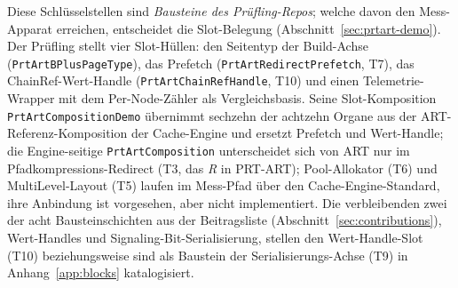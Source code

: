 \begin{nurkurz}
Diese Schlüsselstellen sind \emph{Bausteine des Prüfling-Repos}; welche davon den Mess-Apparat erreichen,
entscheidet die Slot-Belegung (Abschnitt~\ref{sec:prtart-demo}). Der Prüfling stellt vier Slot-Hüllen: den
Seitentyp der Build-Achse (\texttt{PrtArtBPlusPageType}), das Prefetch (\texttt{PrtArtRedirectPrefetch},
T7), das ChainRef-Wert-Handle (\texttt{PrtArtChainRefHandle}, T10) und einen Telemetrie-Wrapper mit dem
Per-Node-Zähler als Vergleichsbasis. Seine Slot-Komposition \texttt{PrtArtCompositionDemo} übernimmt
sechzehn der achtzehn Organe aus der ART-Referenz-Komposition der Cache-Engine und ersetzt Prefetch und
Wert-Handle; die Engine-seitige \texttt{PrtArtComposition} unterscheidet sich von ART nur im
Pfadkompressions-Redirect (T3, das \emph{R} in PRT-ART); Pool-Allokator (T6) und MultiLevel-Layout (T5)
laufen im Mess-Pfad über den Cache-Engine-Standard, ihre Anbindung ist vorgesehen, aber nicht
implementiert. Die verbleibenden zwei der acht Bausteinschichten aus der Beitragsliste
(Abschnitt~\ref{sec:contributions}), Wert-Handles und Signaling-Bit-Serialisierung, stellen den
Wert-Handle-Slot (T10) beziehungsweise sind als Baustein der Serialisierungs-Achse (T9) in
Anhang~\ref{app:blocks} katalogisiert.
\end{nurkurz}

